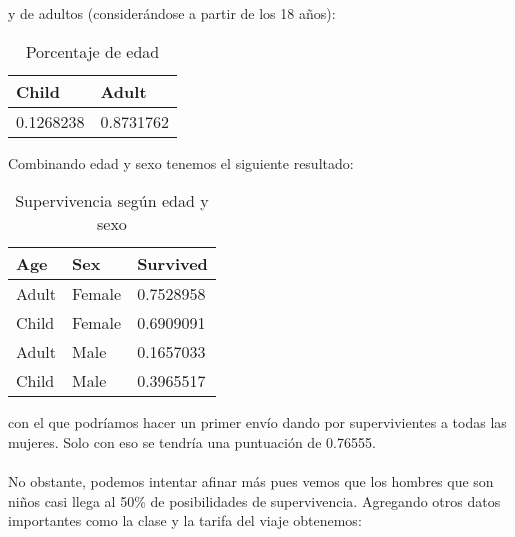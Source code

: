 y de adultos (considerándose a partir de los 18 años):

\begin{table}[H]
	\centering
	\caption{Porcentaje de edad}
	\label{tab:child-adult}
	\begin{tabular}{|ll|}
		\hline
		Child     & Adult     \\ \hline
		0.1268238 & 0.8731762 \\ \hline
	\end{tabular}
\end{table}

Combinando edad y sexo tenemos el siguiente resultado:

\begin{table}[H]
	\centering
	\caption{Supervivencia según edad y sexo}
	\label{tab:age-sex}
	\begin{tabular}{|ll|l|}
		\hline
		Age   & Sex    & Survived  \\ \hline
		Adult & Female & 0.7528958 \\
		Child & Female & 0.6909091 \\
		Adult & Male   & 0.1657033 \\
		Child & Male   & 0.3965517 \\ \hline
	\end{tabular}
\end{table}

con el que podríamos hacer un primer envío dando por supervivientes a todas las mujeres. Solo con eso se tendría una puntuación de 0.76555.
\\ \\
No obstante, podemos intentar afinar más pues vemos que los hombres que son niños casi llega al 50\% de posibilidades de supervivencia. Agregando otros datos importantes como la clase y la tarifa del viaje obtenemos:

